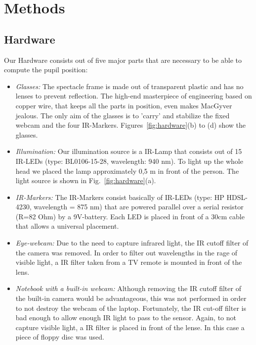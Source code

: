 \section{Methods}\label{methods}

\subsection{Hardware}

Our Hardware consists out of five major parts that are necessary to be able to compute the pupil position:

\begin{itemize}
  \item \textit{Glasses:} 
  The spectacle frame is made out of transparent plastic and has no lenses to prevent reflection. 
  The high-end masterpiece of engineering based on copper wire, that keeps all the parts in position, even makes MacGyver jealous.
  The only aim of the glasses is to 'carry' and stabilize the fixed webcam and the four IR-Markers. Figures~\ref{fig:hardware}(b) to (d) show the glasses.

\item \textit{Illumination:}
  Our illumination source is a IR-Lamp that consists out of 15 IR-LEDs (type: BL0106-15-28, wavelength: 940 nm). To light up the whole head we placed the lamp approximately 0,5 m in front of the person. The light source is shown in Fig.~\ref{fig:hardware}(a).

  \item \textit{IR-Markers:} 
The IR-Markers consist basically of IR-LEDs (type: HP HDSL-4230, wavelength = 875 nm) that are powered parallel over a serial resistor (R=82 Ohm) by a 9V-battery. Each LED is placed in front of a 30cm cable that allows a universal placement. 

  \item \textit{Eye-webcam:} Due to the need to capture infrared light, the IR cutoff filter of the camera was removed. In order to filter out wavelengths in the rage of visible light, a IR filter taken from a TV remote is mounted in front of the lens.

  \item \textit{Notebook with a built-in webcam:} Although removing the IR cutoff filter of the built-in camera would be advantageous, this was not performed in order to not destroy the webcam of the laptop. 
    Fortunately, the IR cut-off filter is bad enough to allow enough IR light to pass to the sensor. 
    Again, to not capture visible light, a IR filter is placed in front of the lense. In this case a piece of floppy disc was used.


\end{itemize}

